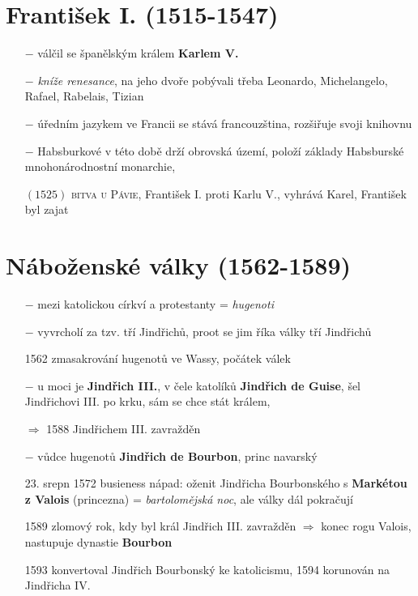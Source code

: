 \documentclass{article}
\begin{document}
\section*{František I. (1515-1547)}
\begin{itemize}
    \vspace{-0.5em}
    \setlength\itemsep{0.15em}
    \item[$-$] válčil se španělským králem \textbf{Karlem V.}
    \item[$-$] \textit{kníže renesance}, na jeho dvoře pobývali třeba Leonardo, Michelangelo, Rafael, Rabelais, Tizian
    \item[$-$] úředním jazykem ve Francii se stává francouzština, rozšiřuje svoji knihovnu
    \item[$-$] Habsburkové v této době drží obrovská území, položí základy Habsburské mnohonárodnostní monarchie, 
    \item[$(1525)$]\textsc{bitva u Pávie}, František I. proti Karlu V., vyhrává Karel, František byl zajat
\end{itemize}


\section*{Náboženské války (1562-1589)}
\begin{itemize}
    \vspace{-0.5em}
    \setlength\itemsep{0.15em}
    \item[$-$] mezi katolickou církví a protestanty = \textit{hugenoti}
    \item[$-$] vyvrcholí za tzv. tří Jindřichů, proot se jim říka války tří Jindřichů
    \item[1562] zmasakrování hugenotů ve Wassy, počátek válek
    \item[$-$] u moci je \textbf{Jindřich III.}, v čele katolíků \textbf{Jindřich de Guise}, šel Jindřichovi III. po krku, sám se chce stát králem,
    \item[$\Rightarrow$] 1588 Jindřichem III. zavražděn
    \item[$-$] vůdce hugenotů \textbf{Jindřich de Bourbon}, princ navarský
    \item[23. srepn 1572] busieness nápad: oženit Jindřicha Bourbonského s \textbf{Markétou z Valois} (princezna) = \textit{bartolomějská noc}, ale války dál pokračují
    \item[1589] zlomový rok, kdy byl král Jindřich III. zavražděn $\Rightarrow$ konec rogu Valois, nastupuje dynastie \textbf{Bourbon}
    \item[1593] konvertoval Jindřich Bourbonský ke katolicismu, 1594 korunován na Jindřicha IV.
\end{itemize}
\end{document}
